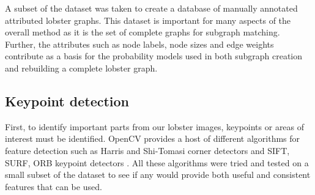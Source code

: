\noindent
A subset of the dataset was taken to create a database of manually annotated attributed lobster graphs. This dataset is important for many aspects of the overall method as it is the set of complete graphs for subgraph matching. Further, the attributes such as node labels, node sizes and edge weights contribute as a basis for the probability models used in both subgraph creation and rebuilding a complete lobster graph. 

\subsection{Keypoint detection}
First, to identify important parts from our lobster images, keypoints or areas of interest must be identified. OpenCV provides a host of different algorithms for feature detection such as Harris and Shi-Tomasi corner detectors and SIFT, SURF, ORB keypoint detectors \cite{opencv-tut1}. All these algorithms were tried and tested on a small subset of the dataset to see if any would provide both useful and consistent features that can be used. 

